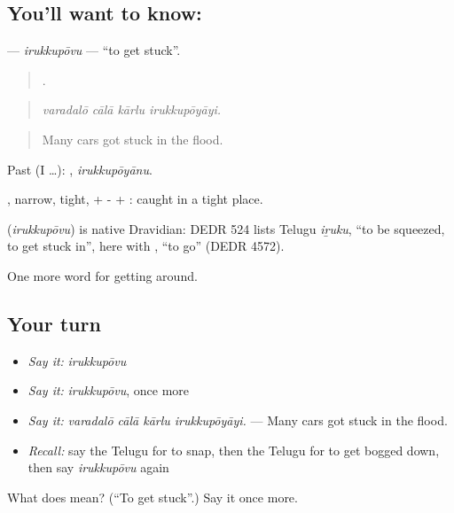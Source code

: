 \subsection*{You'll want to know: }
\textbf{} — \emph{irukkupōvu} — \textquotedblleft{}to get stuck\textquotedblright{}.

\begin{quote}
   .
\end{quote}

\begin{quote}
\emph{varadalō cālā kārlu irukkupōyāyi.}
\end{quote}

\begin{quote}
Many cars got stuck in the flood.
\end{quote}

Past (I …): , \emph{irukkupōyānu}.

, narrow, tight, + - + : caught in a tight place.

\begin{cousinweb}
\textbf{} (\emph{irukkupōvu}) is native Dravidian: DEDR 524 lists Telugu \emph{iṟuku}, \textquotedblleft{}to be squeezed, to get stuck in\textquotedblright{}, here with , \textquotedblleft{}to go\textquotedblright{} (DEDR 4572).
\end{cousinweb}

\begin{grammarlens}[title={What you've built}]
One more word for getting around.
\end{grammarlens}

\subsection*{Your turn}
\begin{itemize}
\raggedright
  \item \emph{Say it:} \emph{irukkupōvu}
  \item \emph{Say it:} \emph{irukkupōvu}, once more
  \item \emph{Say it:} \emph{varadalō cālā kārlu irukkupōyāyi.} — Many cars got stuck in the flood.
  \item \emph{Recall:} say the Telugu for to snap, then the Telugu for to get bogged down, then say \emph{irukkupōvu} again
\end{itemize}

\begin{tcolorbox}[breakable,colback=teal!4,colframe=teal!35!black,title={Before you move on}]
What does  mean? (\textquotedblleft{}To get stuck\textquotedblright{}.) Say it once more.
\end{tcolorbox}
